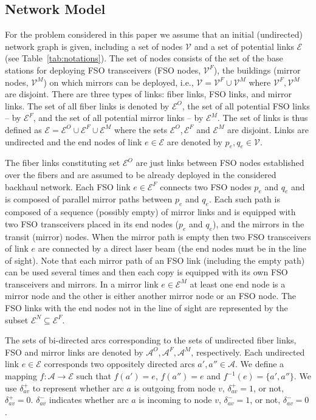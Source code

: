 \documentclass[onecolumn,11pt,draftclsnofoot]{IEEEtran}
\begin{document}
\subsection{Network Model}
For the problem considered in this paper we assume that an initial (undirected) network graph is given, including a set of nodes $\mathcal V$ and a set of potential links $\mathcal E$ (see Table~\ref{tab:notations}).
The set of nodes consists of the set of the base stations for deploying FSO transceivers (FSO nodes, $\mathcal V^F$), the buildings (mirror nodes, $\mathcal V^M$) on which mirrors can be deployed, i.e., $\mathcal V = \mathcal V^F \cup \mathcal V^M$ where $\mathcal V^F, \mathcal V^M$ are disjoint. There are three types of links: fiber links, FSO links, and mirror links. The set of all fiber links is denoted by $\mathcal E^O$, the set of all potential FSO links -- by $\mathcal E^F$, and the set of all potential mirror links -- by $\mathcal E^M$. The set of links is thus defined as $\mathcal E = \mathcal E^O \cup \mathcal E^F \cup \mathcal E^M$ where the sets $\mathcal E^O, \mathcal E^F$ and $\mathcal E^M$ are disjoint. Links are undirected and the end nodes of link $e \in \mathcal E$ are denoted by $p_e,q_e \in \mathcal V$.

The fiber links constituting set $\mathcal E^O$ are just links between FSO nodes established over the fibers and are assumed to be already deployed in the considered backhaul network.
Each FSO link $e \in \mathcal E^F$ connects two FSO nodes $p_e$ and $q_e$ and is composed of parallel mirror paths between $p_e$ and $q_e$. Each such path is composed of a sequence (possibly empty) of mirror links and is equipped with two FSO transceivers placed in its end nodes ($p_e$ and $q_e$), and the mirrors in the transit (mirror) nodes. When the mirror path is empty then two FSO transceivers of link $e$ are connected by a direct laser beam (the end nodes must be in the line of sight). Note that each mirror path of an FSO link (including the empty path) can be used several times and then each copy is equipped with its own FSO transceivers and mirrors. In a mirror link $e \in \mathcal E^M$ at least one end node is a mirror node and the other is either another mirror node or an FSO node. The FSO links with the end nodes not in the line of sight are represented by the subset $\mathcal E^N  \subseteq  \mathcal E^F$.

The sets of bi-directed arcs corresponding to the sets of undirected fiber links, FSO and mirror links are denoted by $\mathcal A^O, \mathcal A^F, \mathcal A^M$, respectively. Each undirected link $e \in \mathcal E$ corresponds two oppositely directed arcs $a', a'' \in \mathcal A$. We define a mapping $f: \mathcal A \rightarrow \mathcal E$ such that $f(a')= e$, $f(a'')=e$ and $f^{-1}(e)=\{a',a''\}$.
We use $\delta^+_{av}$ to represent whether arc $a$ is outgoing from node $v$, $\delta^+_{av}=1$, or not, $\delta^+_{av}=0$. $\delta^-_{av}$ indicates whether arc $a$ is incoming to node $v$, $\delta^-_{av}=1$, or not, $\delta^-_{av}=0$.
\end{document}
